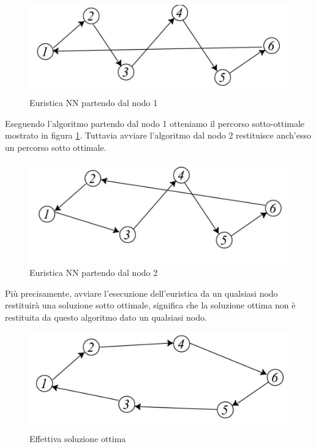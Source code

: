 \documentclass{article}
\begin{document}
    \begin{figure}[H]
        \centering
        \includegraphics[scale=0.4]{images/nume_exampl-NN-tsp1.png}
        \caption{Euristica NN partendo dal nodo 1}
        \label{fig:NN1}
    \end{figure}
    Eseguendo l'algoritmo partendo dal nodo 1 otteniamo il percorso sotto-ottimale mostrato in figura
    \ref{fig:NN1}. Tuttavia avviare l'algoritmo dal nodo 2 restituisce anch'esso un percorso sotto ottimale.
    \begin{figure}[H]
        \centering
        \includegraphics[scale=0.4]{images/nume_exampl-NN-tsp2.png}
        \caption{Euristica NN partendo dal nodo 2}
    \end{figure}
    Più precisamente, avviare l'esecuzione dell'euristica da un qualsiasi nodo restituirà una soluzione
    sotto ottimale, significa che la soluzione ottima non è restituita da questo algoritmo dato un
    qualsiasi nodo.
    \begin{figure}
        \centering
        \includegraphics[scale=0.4]{images/nume_exampl-NN-tsp3.png}
        \caption{Effettiva soluzione ottima}
    \end{figure}
\end{document}
